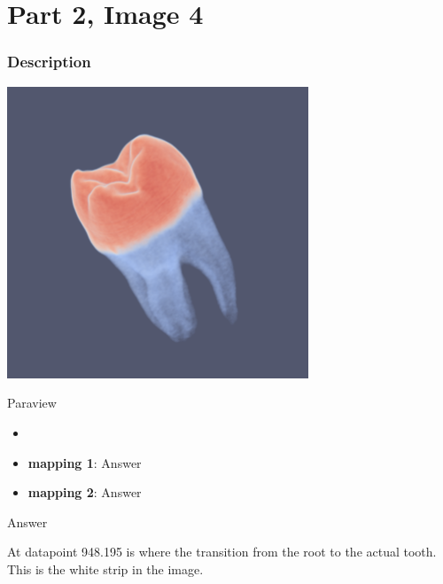 \hypertarget{part-2-image-4}{%
\section{Part 2, Image 4}\label{part-1-design-2}}

\centering


\hypertarget{description}{%
	\subsubsection{Description}\label{description}}

\begin{description}
	\item[Image:]
	\item\includegraphics[width=9cm]{Tooth2.png}

	\item[Tool:]
	Paraview
	\item[Visual Mappings:]
	\begin{itemize}
		\tightlist
		\item[ ]
	\end{itemize}
	\begin{itemize}
		\tightlist
		\item
		\textbf{mapping 1}: Answer
	\end{itemize}
	
	\begin{itemize}
		\tightlist
		\item
		\textbf{mapping 2}: Answer
	\end{itemize}
	\item[Data Conversion:] Answer
	\item[Unique Observation:]
	At datapoint 948.195 is where the transition from the root to the actual tooth. This is the white strip in the image.
	
\end{description}